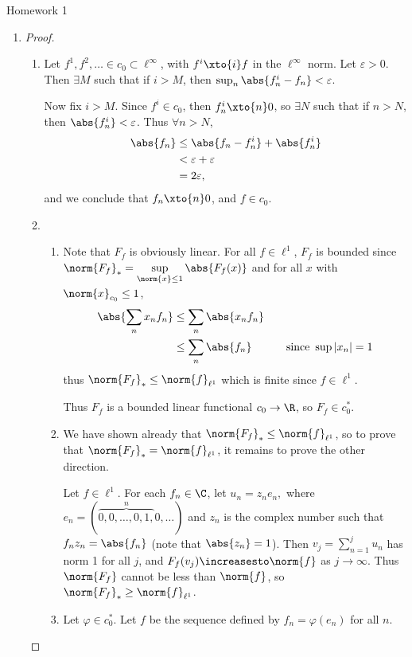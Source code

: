 \documentclass[12pt,letterpaper]{article}
\renewcommand{\phi}{\varphi}
\renewcommand{\epsilon}{\varepsilon}
\begin{document}
\pagestyle{fancy}
\begin{center}
{\Large Homework 1}%
\end{center}


\begin{enumerate}
\item[]

\begin{proof}
	\begin{enumerate}[label=(\alph*)]
	\item Let $f^{1}, f^2, \ldots \in c_0\subset\ell^\infty$, with $f^i\xto{i}f$ in the $\ell^\infty$ norm. Let $\epsilon>0$. Then $\exists M$ such that if $i>M$, then $\sup_{n}\abs{f^i_n-f_n}<\epsilon$. 
	
	Now fix $i>M$. Since $f^i\in c_0$, then $f^i_n \xto{n} 0$, so $\exists N$ such that if $n>N$, then $\abs{f^i_n}<\epsilon$. Thus $\forall n > N$, 
		\begin{align*}
		\abs{f_n} &\leq \abs{f_n-f^i_n} + \abs{f^i_n}\\
		&< \epsilon + \epsilon \\
		&=2\epsilon,
		\end{align*}
	and we conclude that $f_n\xto{n}0$, and $f\in c_0$. \qedwhite
	
	\item 
		\begin{enumerate}[label=(\roman*)]
		\item Note that $F_f$ is obviously linear. For all $f\in \ell^1$, $F_f$ is bounded since $\norm{F_f}_*=\sup\limits_{\norm{x}\leq 1}\abs{F_f(x)}$ and for all $x$ with $\norm{x}_{c_0}\leq 1$, 
		\begin{alignat*}{2}
		\abs{\sum_n x_nf_n} 
		&\leq \sum_n \abs{x_nf_n} \\
		&\leq \sum_n \abs{f_n} & \quad \text{since }\sup |x_n| =1
		\end{alignat*}
		thus $\norm{F_f}_*\leq\norm{f}_{\ell^1}$ which is finite since $f\in \ell^1$. 
		
		Thus $F_f$ is a bounded linear functional $c_0\to \R$, so $F_f\in c_0^*$. \qedwhite
		
		\item We have shown already that $\norm{F_f}_*\leq\norm{f}_{\ell^1}$, so to prove that $\norm{F_f}_*=\norm{f}_{\ell^1}$, it remains to prove the other direction.
		
		Let $f\in \ell^1$. For each $f_n\in \C$, let 
		$u_n=z_ne_n,$
		where $e_n=(\overbrace{0, 0, \dots, 0, 1,}^n 0, \dots )$ and $z_n$ is the complex number such that $f_nz_n=\abs{f_n}$ (note that $\abs{z_n}=1$). Then $v_j=\sum_{n=1}^j u_n$ has norm 1 for all $j$, and $F_f(v_j)\increasesto\norm{f}$ as $j\to \infty$. Thus $\norm{F_f}$ cannot be less than $\norm{f}$, so $\norm{F_f}_*\geq\norm{f}_{\ell^1}$. \qedwhite
		\pagebreak
		\item Let $\phi\in c_0^*$. Let $f$ be the sequence defined by $f_n=\phi(e_n)$ for all $n$.
		

\end{enumerate}
\end{enumerate}
\end{proof}
\end{enumerate}
\end{document}
